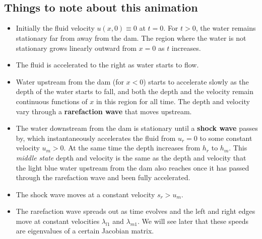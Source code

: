 \documentclass{SIAMbook2016}
\providecommand{\tightlist}{%
      \setlength{\itemsep}{0pt}\setlength{\parskip}{0pt}}
\begin{document}
    \begin{center}
    \end{center}
    { \hspace*{\fill} \\}
    
    \begin{center}
    \end{center}
    { \hspace*{\fill} \\}
    
\hypertarget{things-to-note-about-this-animation}{%
\subsection{Things to note about this
animation}\label{things-to-note-about-this-animation}}

\begin{itemize}
\tightlist
\item
  Initially the fluid velocity \(u(x,0) \equiv 0\) at \(t=0\). For
  \(t>0\), the water remains stationary far from away from the dam. The
  region where the water is not stationary grows linearly outward from
  \(x=0\) as \(t\) increases.
\item
  The fluid is accelerated to the right as water starts to flow.
\item
  Water upstream from the dam (for \(x<0\)) starts to accelerate slowly
  as the depth of the water starts to fall, and both the depth and the
  velocity remain continuous functions of \(x\) in this region for all
  time. The depth and velocity vary through a \textbf{rarefaction wave}
  that moves upstream.
\item
  The water downstream from the dam is stationary until a \textbf{shock
  wave} passes by, which instantaneously accelerates the fluid from
  \(u_r=0\) to some constant velocity \(u_m >0\). At the same time the
  depth increases from \(h_r\) to \(h_m\). This \emph{middle state}
  depth and velocity is the same as the depth and velocity that the
  light blue water upstream from the dam also reaches once it has passed
  through the rarefaction wave and been fully accelerated.
\item
  The shock wave moves at a constant velocity \(s_r > u_m\).
\item
  The rarefaction wave spreads out as time evolves and the left and
  right edges move at constant velocities \(\lambda_{l1}\) and
  \(\lambda_{m1}\). We will see later that these speeds are eigenvalues
  of a certain Jacobian matrix.
\end{itemize}
\end{document}

